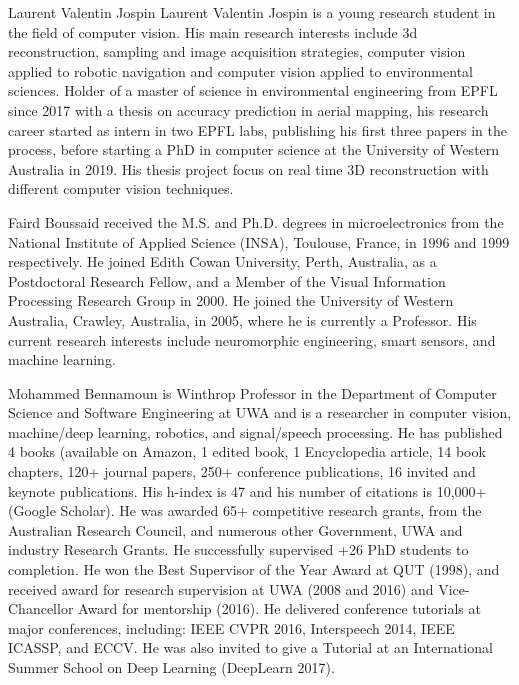 \documentclass[10pt,journal,compsoc]{IEEEtran}
\begin{document}
\begin{IEEEbiography}{Laurent Valentin Jospin} Laurent Valentin Jospin is a young research student in the field of computer vision. His main research interests include 3d reconstruction, sampling and image acquisition strategies, computer vision applied to robotic navigation and computer vision applied to environmental sciences.
Holder of a master of science in environmental engineering from EPFL since 2017 with a thesis on accuracy prediction in aerial mapping, his research career started as intern in two EPFL labs, publishing his first three papers in the process, before starting a PhD in computer science at the University of Western Australia in 2019. His thesis project focus on real time 3D reconstruction with different computer vision techniques.
\end{IEEEbiography}

\begin{IEEEbiography}{Faird Boussaid}  received the M.S. and Ph.D. degrees in microelectronics from the
National Institute of Applied Science (INSA), Toulouse, France, in 1996 and 1999 respectively. He joined Edith Cowan University, Perth, Australia, as a Postdoctoral Research Fellow, and a Member of the Visual Information Processing Research Group in 2000. He joined the University of Western Australia, Crawley, Australia, in 2005, where he is currently a Professor. His current research interests include neuromorphic engineering, smart sensors, and machine learning.
\end{IEEEbiography}

\begin{IEEEbiography}{Mohammed Bennamoun}  is Winthrop Professor in the Department of Computer Science and Software Engineering at UWA and is a researcher in computer vision, machine/deep learning, robotics, and signal/speech processing. He has published 4 books (available on Amazon, 1 edited book, 1 Encyclopedia article, 14 book chapters, 120+ journal papers, 250+ conference publications, 16 invited and keynote publications. His h-index is 47 and his number of citations is 10,000+ (Google Scholar). He was awarded 65+ competitive research grants, from the Australian Research Council, and numerous other Government, UWA and industry Research Grants. He successfully supervised +26 PhD students to completion. He won the Best Supervisor of the Year Award at QUT (1998), and received award for research supervision at UWA (2008 and 2016) and Vice-Chancellor Award for mentorship (2016).  He delivered conference tutorials at major conferences, including: IEEE  CVPR 2016, Interspeech 2014, IEEE ICASSP, and ECCV. He was also invited to give a Tutorial at an International Summer School on Deep Learning (DeepLearn 2017).
\end{IEEEbiography}
\end{document}
